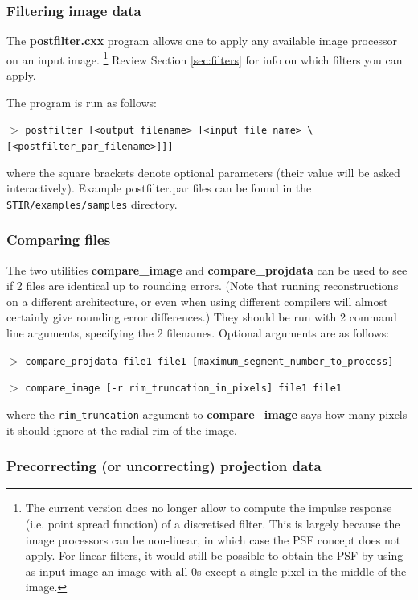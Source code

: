 \documentclass{article}
\newcommand{\cmdline}[1]{\par \noindent $>$ \texttt{#1}\par}
\begin{document}
{{\subsubsection{
Filtering image data}

The \textbf{postfilter.cxx} program allows one to apply any available 
image processor on an input image. \footnote{{\small The current version 
does no longer allow to compute the impulse response (i.e. point 
spread function) of a discretised filter. This is largely because 
the image processors can be non-linear, in which case the PSF 
concept does not apply. For linear filters, it would still be 
possible to obtain the PSF by using as input image an image with 
all 0s except a single pixel in the middle of the image.}} Review 
Section \ref{sec:filters} for info on which filters you can apply.


The program is run as follows:
\cmdline{postfilter [\texttt{<}output filename\texttt{>} [\texttt{<}input file 
name\texttt{>} {\textbackslash}\\
{[}\texttt{<}postfilter\_par\_filename\texttt{>}]]]}

where the square brackets denote optional parameters (their value 
will be asked interactively). Example postfilter.par files can 
be found in the \texttt{STIR/examples/samples} directory.


\subsubsection{
Comparing files}

The two utilities \textbf{compare\_image} and \textbf{compare\_projdata} 
can be used to see if 2 files are identical up to rounding errors. 
(Note that running reconstructions on a different architecture, 
or even when using different compilers will almost certainly 
give rounding error differences.) They should be run with 2 command 
line arguments, specifying the 2 filenames. Optional arguments 
are as follows:
\cmdline{compare\_projdata file1 file1 
[maximum\_segment\_number\_to\_process]}
\cmdline{compare\_image [-r rim\_truncation\_in\_pixels] file1 file1}


where the \texttt{rim\_truncation} argument to \textbf{compare\_image}  says 
how many pixels it should ignore at the radial rim of the image.



\subsubsection{
Precorrecting (or uncorrecting) projection data}

}}
\end{document}
